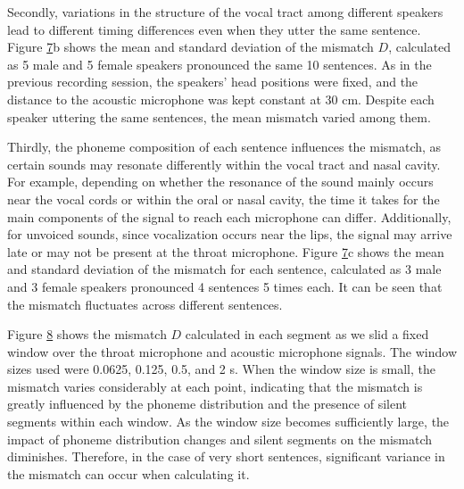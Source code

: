 \documentclass[10pt]{wlscirep}
\begin{document}
Secondly, variations in the structure of the vocal tract among different speakers lead to different timing differences even when they utter the same sentence. Figure \hyperref[fig:7]{7}b shows the mean and standard deviation of the mismatch $D$, calculated as 5 male and 5 female speakers pronounced the same 10 sentences. As in the previous recording session, the speakers' head positions were fixed, and the distance to the acoustic microphone was kept constant at 30 cm. Despite each speaker uttering the same sentences, the mean mismatch varied among them.

Thirdly, the phoneme composition of each sentence influences the mismatch, as certain sounds may resonate differently within the vocal tract and nasal cavity. For example, depending on whether the resonance of the sound mainly occurs near the vocal cords or within the oral or nasal cavity, the time it takes for the main components of the signal to reach each microphone can differ. Additionally, for unvoiced sounds, since vocalization occurs near the lips\cite{Zhang2016acoust}, the signal may arrive late or may not be present at the throat microphone. Figure \hyperref[fig:7]{7}c shows the mean and standard deviation of the mismatch for each sentence, calculated as 3 male and 3 female speakers pronounced 4 sentences 5 times each. It can be seen that the mismatch fluctuates across different sentences.

Figure \hyperref[fig:8]{8} shows the mismatch $D$ calculated in each segment as we slid a fixed window over the throat microphone and acoustic microphone signals. The window sizes used were 0.0625, 0.125, 0.5, and 2 s. When the window size is small, the mismatch varies considerably at each point, indicating that the mismatch is greatly influenced by the phoneme distribution and the presence of silent segments within each window. As the window size becomes sufficiently large, the impact of phoneme distribution changes and silent segments on the mismatch diminishes. Therefore, in the case of very short sentences, significant variance in the mismatch can occur when calculating it.
\end{document}
